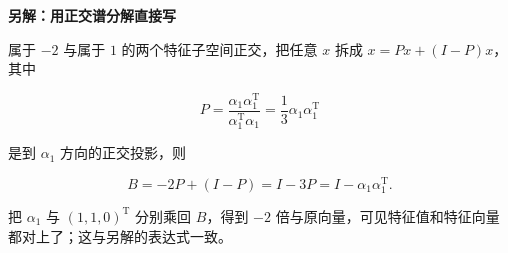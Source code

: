 \documentclass[UTF8,11pt,fontset=windows]{ctexart}
\begin{document}
{\bfseries 另解：用正交谱分解直接写\par}
属于 $-2$ 与属于 $1$ 的两个特征子空间正交，把任意 $x$ 拆成 $x=Px+(I-P)x$，其中

$$
P=\frac{\alpha_1\alpha_1^{\mathrm T}}{\alpha_1^{\mathrm T}\alpha_1}
=\frac13\alpha_1\alpha_1^{\mathrm T}
$$

是到 $\alpha_1$ 方向的正交投影，则

$$
B=-2P+(I-P)=I-3P=I-\alpha_1\alpha_1^{\mathrm T}.
$$

把 $\alpha_1$ 与 $(1,1,0)^{\mathrm T}$ 分别乘回 $B$，得到 $-2$ 倍与原向量，可见特征值和特征向量都对上了；这与另解的表达式一致。
\end{document}
